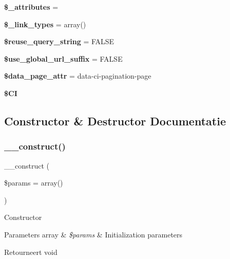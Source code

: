 \begin{DoxyCompactItemize}
{\bfseries \$\+\_\+attributes} = \textquotesingle{}\textquotesingle{}
\item 
\mbox{\label{class_c_i___pagination_a6bb16f8a41b808305d99487eaf429717}} 
{\bfseries \$\+\_\+link\+\_\+types} = array()
\item 
\mbox{\label{class_c_i___pagination_aaca516d12ed63aa4523ab88dd46e067d}} 
{\bfseries \$reuse\+\_\+query\+\_\+string} = F\+A\+L\+SE
\item 
\mbox{\label{class_c_i___pagination_aa2ec11ced927cd6f4e62fa19a4e35325}} 
{\bfseries \$use\+\_\+global\+\_\+url\+\_\+suffix} = F\+A\+L\+SE
\item 
\mbox{\label{class_c_i___pagination_a3bbb05bafee2889f825aa40dcd684426}} 
{\bfseries \$data\+\_\+page\+\_\+attr} = \textquotesingle{}data-\/ci-\/pagination-\/page\textquotesingle{}
\item 
\mbox{\label{class_c_i___pagination_ae0314d046ddf7fcfaec03222977427d3}} 
{\bfseries \$\+CI}
\end{DoxyCompactItemize}


\subsection{Constructor \& Destructor Documentatie}
\mbox{\label{class_c_i___pagination_a568ecdb0d73d2a870f33189739922a50}} 
\subsubsection{\texorpdfstring{\_\_construct()}{\_\_construct()}}
{\footnotesize\ttfamily \+\_\+\+\_\+construct (\begin{DoxyParamCaption}\item[{}]{\$params = {\ttfamily array()} }\end{DoxyParamCaption})}

Constructor


\begin{DoxyParams}[1]{Parameters}
array & {\em \$params} & Initialization parameters \\
\hline
\end{DoxyParams}
\begin{DoxyReturn}{Retourneert}
void 
\end{DoxyReturn}


